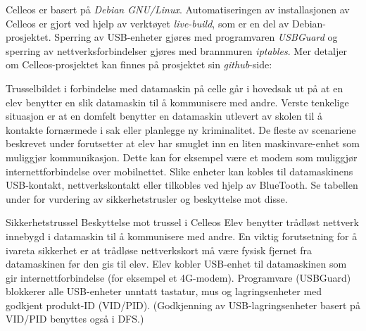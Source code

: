 
Celleos er basert p\aa{} {\it Debian GNU/Linux}. Automatiseringen av installasjonen av Celleos er gjort ved hjelp av verkt\o yet {\it live-build}, som er en del av Debian-prosjektet. Sperring av USB-enheter gj\o res med programvaren {\it USBGuard} og sperring av nettverksforbindelser gj\o res med brannmuren {\it iptables}. Mer detaljer om Celleos-prosjektet kan finnes p\aa{} prosjektet sin {\it github}-side:
\vskip 8pt


Trusselbildet i forbindelse med datamaskin p\aa{} celle g\aa r i hovedsak ut p\aa{} at en elev benytter en slik datamaskin til \aa{} kommunisere med andre. Verste tenkelige situasjon er at en domfelt benytter en datamaskin utlevert av skolen til \aa{} kontakte forn\ae rmede i sak eller planlegge ny kriminalitet.
De fleste av scenariene beskrevet under forutsetter at elev har smuglet inn en liten maskinvare-enhet som muliggj\o r kommunikasjon. Dette kan for eksempel v\ae re et modem som muliggj\o r internettforbindelse over mobilnettet. Slike enheter kan kobles til datamaskinens USB-kontakt, nettverkskontakt eller tilkobles ved hjelp av BlueTooth.
Se tabellen under for vurdering av sikkerhetstrusler og beskyttelse mot disse.

Sikkerhetstrussel	Beskyttelse mot trussel i Celleos
Elev benytter tr\aa dl\o st nettverk innebygd i datamaskin til \aa{} kommunisere med andre.	En viktig forutsetning for \aa{} ivareta sikkerhet er at tr\aa dl\o se nettverkskort m\aa{} v\ae re fysisk fjernet fra datamaskinen f\o r den gis til elev.
Elev kobler USB-enhet til datamaskinen som gir internettforbindelse (for eksempel et 4G-modem).	Programvare (USBGuard) blokkerer alle USB-enheter unntatt tastatur, mus og lagringsenheter med godkjent produkt-ID (VID/PID). (Godkjenning av USB-lagringsenheter basert p\aa{} VID/PID benyttes ogs\aa{} i DFS.)

